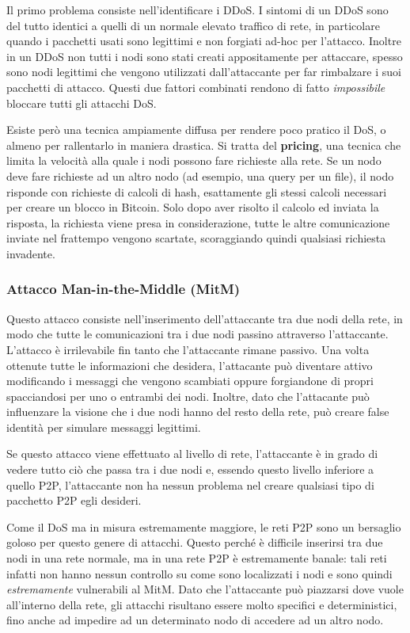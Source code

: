 Il primo problema consiste nell'identificare i DDoS. I sintomi di un DDoS sono del tutto identici a quelli di un normale elevato traffico di rete, in particolare quando i pacchetti usati sono legittimi e non forgiati ad-hoc per l'attacco. Inoltre in un DDoS non tutti i nodi sono stati creati appositamente per attaccare, spesso sono nodi legittimi che vengono utilizzati dall'attaccante per far rimbalzare i suoi pacchetti di attacco. Questi due fattori combinati rendono di fatto \emph{impossibile} bloccare tutti gli attacchi DoS.

Esiste però una tecnica ampiamente diffusa per rendere poco pratico il DoS, o almeno per rallentarlo in maniera drastica. Si tratta del \textbf{pricing}, una tecnica che limita la velocità alla quale i nodi possono fare richieste alla rete. Se un nodo deve fare richieste ad un altro nodo (ad esempio, una query per un file), il nodo risponde con richieste di calcoli di hash, esattamente gli stessi calcoli necessari per creare un blocco in Bitcoin. Solo dopo aver risolto il calcolo ed inviata la risposta, la richiesta viene presa in considerazione, tutte le altre comunicazione inviate nel frattempo vengono scartate, scoraggiando quindi qualsiasi richiesta invadente.

\subsubsection{Attacco Man-in-the-Middle (MitM)}\label{attacco-man-in-the-middle-mitm}

Questo attacco consiste nell'inserimento dell'attaccante tra due nodi della rete, in modo che tutte le comunicazioni tra i due nodi passino attraverso l'attaccante. L'attacco è irrilevabile fin tanto che l'attaccante rimane passivo. Una volta ottenute tutte le informazioni che desidera, l'attacante può diventare attivo modificando i messaggi che vengono scambiati oppure forgiandone di propri spacciandosi per uno o entrambi dei nodi. Inoltre, dato che l'attacante può influenzare la visione che i due nodi hanno del resto della rete, può creare false identità per simulare messaggi legittimi.

Se questo attacco viene effettuato al livello di rete, l'attaccante è in grado di vedere tutto ciò che passa tra i due nodi e, essendo questo livello inferiore a quello P2P, l'attaccante non ha nessun problema nel creare qualsiasi tipo di pacchetto P2P egli desideri.

Come il DoS ma in misura estremamente maggiore, le reti P2P sono un bersaglio goloso per questo genere di attacchi. Questo perché è difficile inserirsi tra due nodi in una rete normale, ma in una rete P2P è estremamente banale: tali reti infatti non hanno nessun controllo su come sono localizzati i nodi e sono quindi \emph{estremamente} vulnerabili al MitM.
Dato che l'attaccante può piazzarsi dove vuole all'interno della rete, gli attacchi risultano essere molto specifici e deterministici, fino anche ad impedire ad un determinato nodo di accedere ad un altro nodo.

